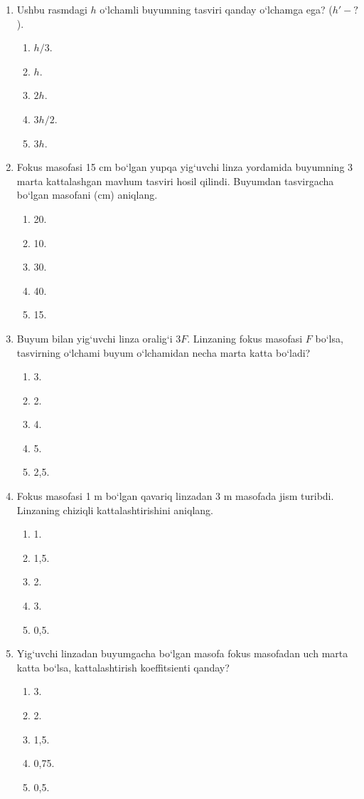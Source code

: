 \begin{enumerate}
\item Ushbu rasmdagi $h$ o‘lchamli buyumning tasviri qanday o‘lchamga ega? ($h'-?$).
\begin{enumerate}[label=\Alph*)]
\item $h/3$.
\item $h$.
\item $2h$.
\item $3h/2$.
\item $3h$.
\end{enumerate}

\item Fokus masofasi 15 cm bo‘lgan yupqa yig‘uvchi linza yordamida buyumning 3 marta kattalashgan mavhum tasviri hosil qilindi. Buyumdan tasvirgacha bo‘lgan masofani (cm) aniqlang.
\begin{enumerate}[label=\Alph*)]
\item 20.
\item 10.
\item 30.
\item 40.
\item 15.
\end{enumerate}

\item Buyum bilan yig‘uvchi linza oralig‘i $3F$. Linzaning fokus masofasi $F$ bo‘lsa, tasvirning o‘lchami buyum o‘lchamidan necha marta katta bo‘ladi?
\begin{enumerate}[label=\Alph*)]
\item 3.
\item 2.
\item 4.
\item 5.
\item 2,5.
\end{enumerate}






\item Fokus masofasi 1 m bo‘lgan qavariq linzadan 3 m masofada jism turibdi. Linzaning chiziqli kattalashtirishini aniqlang.
\begin{enumerate}[label=\Alph*)]
\item 1.
\item 1,5.
\item 2.
\item 3.
\item 0,5.
\end{enumerate}

\item Yig‘uvchi linzadan buyumgacha bo‘lgan masofa fokus masofadan uch marta katta bo‘lsa, kattalashtirish koeffitsienti qanday?
\begin{enumerate}[label=\Alph*)]
\item 3.
\item 2.
\item 1,5.
\item 0,75.
\item 0,5.
\end{enumerate}


\end{enumerate}
